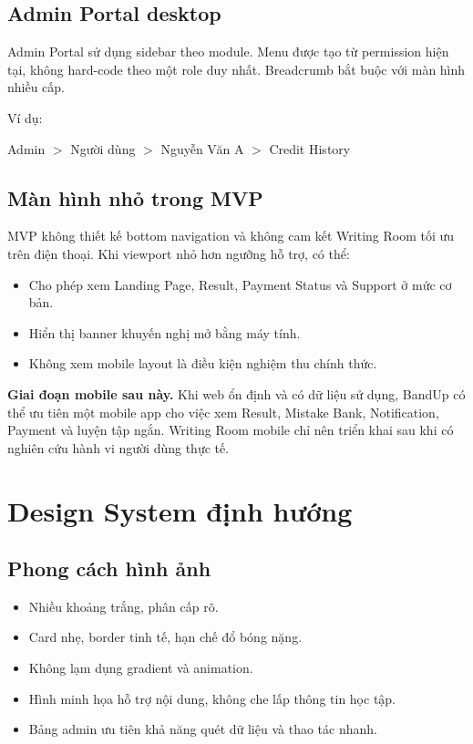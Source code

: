 \documentclass[11pt,a4paper]{article}
\begin{document}
\subsection{Admin Portal desktop}
Admin Portal sử dụng sidebar theo module. Menu được tạo từ permission hiện tại, không hard-code theo một role duy nhất. Breadcrumb bắt buộc với màn hình nhiều cấp.

Ví dụ:
\begin{copybox}
Admin $>$ Người dùng $>$ Nguyễn Văn A $>$ Credit History
\end{copybox}

\subsection{Màn hình nhỏ trong MVP}
MVP không thiết kế bottom navigation và không cam kết Writing Room tối ưu trên điện thoại. Khi viewport nhỏ hơn ngưỡng hỗ trợ, có thể:
\begin{itemize}
  \item Cho phép xem Landing Page, Result, Payment Status và Support ở mức cơ bản.
  \item Hiển thị banner khuyến nghị mở bằng máy tính.
  \item Không xem mobile layout là điều kiện nghiệm thu chính thức.
\end{itemize}

\begin{futurebox}
\textbf{Giai đoạn mobile sau này.} Khi web ổn định và có dữ liệu sử dụng, BandUp có thể ưu tiên một mobile app cho việc xem Result, Mistake Bank, Notification, Payment và luyện tập ngắn. Writing Room mobile chỉ nên triển khai sau khi có nghiên cứu hành vi người dùng thực tế.
\end{futurebox}

\section{Design System định hướng}

\subsection{Phong cách hình ảnh}
\begin{itemize}
  \item Nhiều khoảng trắng, phân cấp rõ.
  \item Card nhẹ, border tinh tế, hạn chế đổ bóng nặng.
  \item Không lạm dụng gradient và animation.
  \item Hình minh họa hỗ trợ nội dung, không che lấp thông tin học tập.
  \item Bảng admin ưu tiên khả năng quét dữ liệu và thao tác nhanh.
\end{itemize}
\end{document}
